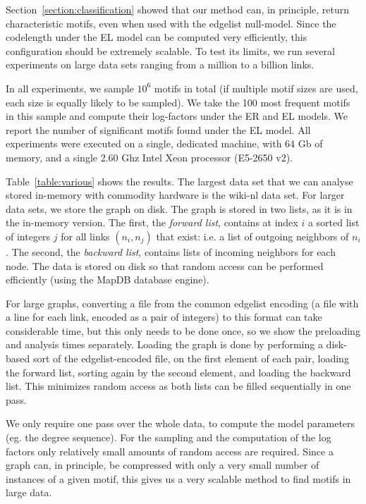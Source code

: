 \documentclass[twoside,11pt]{article}
\begin{document}
\noindent Section~\ref{section:classification} showed that our method can, in principle, return characteristic motifs, even when used with the edgelist null-model. Since the codelength under the EL model can be computed very efficiently, this configuration should be extremely scalable. To test its limits, we run several experiments on large data sets ranging from a million to a billion links.  

In all experiments, we sample $10^6$ motifs in total (if multiple motif sizes are used, each size is equally likely to be sampled). We take the 100 most frequent motifs in this sample and compute their log-factors under the ER and EL models. We report the number of significant motifs found under the EL model. All experiments were executed on a single, dedicated machine, with 64 Gb of memory, and a single 2.60 Ghz Intel Xeon processor (E5-2650 v2).

Table~\ref{table:various} shows the results. The largest data set that we can analyse stored in-memory with commodity hardware is the wiki-nl data set. For larger data sets, we store the graph on disk. The graph is stored in two lists, as it is in the in-memory version. The first, the \emph{forward list}, contains at index $i$ a sorted list of integers $j$ for all links $(n_i,n_j)$ that exist: i.e. a list of outgoing neighbors of $n_i$. The second, the \emph{backward list}, contains lists of incoming neighbors for each node. The data is stored on disk so that random access can be performed efficiently (using the MapDB database engine\footnotemark).


For large graphs, converting a file from the common edgelist encoding (a file with a line for each link, encoded as a pair of integers) to this format can take considerable time, but this only needs to be done once, so we show the preloading and analysis times separately. Loading the graph is done by performing a disk-based sort of the edgelist-encoded file, on the first element of each pair, loading the forward list, sorting again by the second element, and loading the backward list. This minimizes random access as both lists can be filled sequentially in one pass.

We only require one pass over the whole data, to compute the model parameters (eg. the degree sequence). For the sampling and the computation of the log factors only relatively small amounts of random access are required. Since a graph can, in principle, be compressed with only a very small number of instances of a given motif, this gives us a very scalable method to find motifs in large data. 
\end{document}
